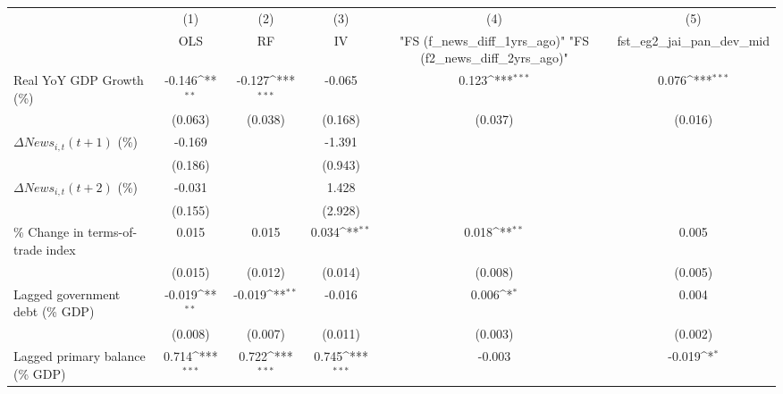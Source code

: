 {
\def\sym#1{\ifmmode^{#1}\else\(^{#1}\)\fi}
\begin{tabular}{l*{5}{c}}
\toprule
                    &\multicolumn{1}{c}{(1)}&\multicolumn{1}{c}{(2)}&\multicolumn{1}{c}{(3)}&\multicolumn{1}{c}{(4)}&\multicolumn{1}{c}{(5)}\\
                    &\multicolumn{1}{c}{OLS}&\multicolumn{1}{c}{RF}&\multicolumn{1}{c}{IV}&\multicolumn{1}{c}{ "FS (f_news_diff_1yrs_ago)"  "FS (f2_news_diff_2yrs_ago)" }&\multicolumn{1}{c}{fst_eg2_jai_pan_dev_mid}\\
\midrule
Real YoY GDP Growth (\%)&      -0.146\sym{**} &      -0.127\sym{***}&      -0.065         &       0.123\sym{***}&       0.076\sym{***}\\
                    &     (0.063)         &     (0.038)         &     (0.168)         &     (0.037)         &     (0.016)         \\
\addlinespace
$ \Delta News_{i,t}(t+1)$ (\%)&      -0.169         &                     &      -1.391         &                     &                     \\
                    &     (0.186)         &                     &     (0.943)         &                     &                     \\
\addlinespace
$ \Delta News_{i,t}(t+2)$ (\%)&      -0.031         &                     &       1.428         &                     &                     \\
                    &     (0.155)         &                     &     (2.928)         &                     &                     \\
\addlinespace
\% Change in terms-of-trade index&       0.015         &       0.015         &       0.034\sym{**} &       0.018\sym{**} &       0.005         \\
                    &     (0.015)         &     (0.012)         &     (0.014)         &     (0.008)         &     (0.005)         \\
\addlinespace
Lagged government debt (\% GDP)&      -0.019\sym{**} &      -0.019\sym{**} &      -0.016         &       0.006\sym{*}  &       0.004         \\
                    &     (0.008)         &     (0.007)         &     (0.011)         &     (0.003)         &     (0.002)         \\
\addlinespace
Lagged primary balance (\% GDP)&       0.714\sym{***}&       0.722\sym{***}&       0.745\sym{***}&      -0.003         &      -0.019\sym{*}  \\

\end{tabular}}
